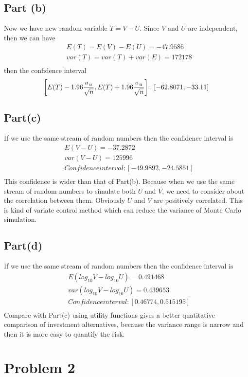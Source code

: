 \documentclass{report}
\begin{document}
\subsection*{Part (b)}
Now we have new random variable $ T=V-U $.  Since $V$ and $U$ are independent, then we can have
\begin{align*}
& E(T) = E(V)-E(U) = -47.9586 \\
& var(T) = var(T)+var(E) = 172178\\
\end{align*}
then the confidence interval  
$$\left[E(T)-1.96\frac{\sigma_u}{\sqrt{n}}, E(T)+1.96\frac{\sigma_u}{\sqrt{n}}\right]  :   [ -62.8071, -33.11 ]\\ $$
 
\subsection*{Part(c)} 
If we use the same stream of random numbers then the confidence interval is
\begin{align*}
& E(V-U) =-37.2872 \\
& var(V-U) = 125996\\
& Confidence interval :  [-49.9892, -24.5851 ] \\
\end{align*}
This confidence is wider than that of Part(b). Because when we use the same stream of random numbers to simulate both $U$ and $V$, we need to consider about the correlation between them. Obviously $U$ and $V$ are positively correlated. This is kind of variate control method which can reduce the variance of Monte Carlo simulation. 

\subsection*{Part(d)} 
If we use the same stream of random numbers then the confidence interval is
\begin{align*}
& E(log_{10}V-log_{10}U) = 0.491468\\
& var(log_{10}V-log_{10}U) = 0.439653\\
& Confidence interval :  [ 0.46774, 0.515195] \\
\end{align*}
Compare with Part(c) using utility functions gives a better quatitative comparison of investment alternatives, because the variance range is narrow and then it is more easy to quantify the risk. 

\newpage
\section*{Problem 2}
\end{document}
